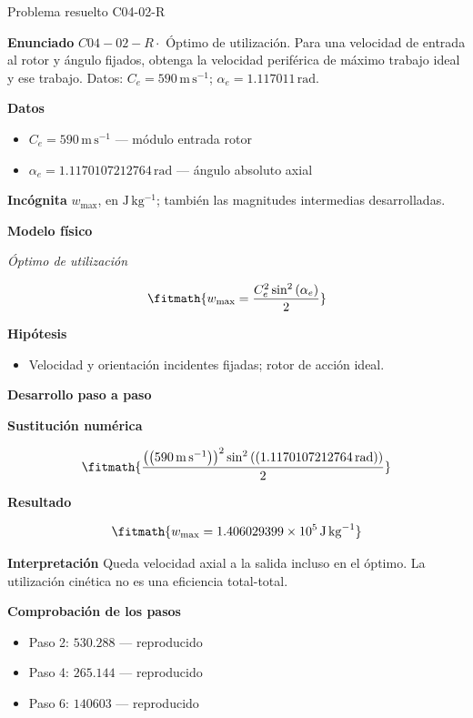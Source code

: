 \documentclass[10pt,openany]{book}
\begin{document}
\begin{studiumworked}{Problema resuelto C04-02-R}


\noindent\textbf{Enunciado}
\(C04-02-R \cdot\) Óptimo de utilización. Para una velocidad de entrada al rotor y ángulo fijados, obtenga la velocidad periférica de máximo trabajo ideal y ese trabajo. Datos: \(C_e=590\, \mathrm{m}\,\mathrm{s}^{-1}\); \(\alpha_e=1.117011\, \mathrm{rad}\).

\noindent\textbf{Datos}
\begin{itemize}
\item $C_e = 590\,\mathrm{m}\,\mathrm{s}^{-1}$ — módulo entrada rotor
\item $\alpha_e = 1.1170107212764\,\mathrm{rad}$ — ángulo absoluto axial
\end{itemize}

\noindent\textbf{Incógnita}
$w_{\max}$, en $\mathrm{J\,kg^{-1}}$; también las magnitudes intermedias desarrolladas.

\noindent\textbf{Modelo físico}

\noindent\textit{Óptimo de utilización}

\[
\fitmath{w_{\max}=\frac{C_e^{2} \sin^{2}{\left(\alpha_e \right)}}{2}}
\]

\noindent\textbf{Hipótesis}
\begin{itemize}
\item Velocidad y orientación incidentes fijadas; rotor de acción ideal.
\end{itemize}

\noindent\textbf{Desarrollo paso a paso}



\noindent\textbf{Sustitución numérica}

\[
\fitmath{\frac{\left(\left(590\,\mathrm{m}\,\mathrm{s}^{-1}\right)\right)^{2} \sin^{2}{\left(\left(1.1170107212764\,\mathrm{rad}\right) \right)}}{2}}
\]

\noindent\textbf{Resultado}

\[
\fitmath{w_{\max}=1.406029399\times10^{5}\,\mathrm{J}\,\mathrm{kg}^{-1}}
\]

\noindent\textbf{Interpretación}
Queda velocidad axial a la salida incluso en el óptimo. La utilización cinética no es una eficiencia total-total.

\noindent\textbf{Comprobación de los pasos}
\begin{itemize}
\item Paso 2: $530.288$ — reproducido
\item Paso 4: $265.144$ — reproducido
\item Paso 6: $140603$ — reproducido
\end{itemize}


\end{studiumworked}
\end{document}
